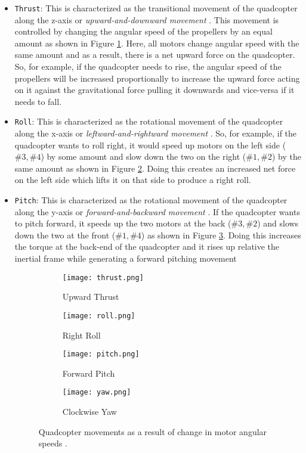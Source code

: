 \documentclass[10pt, a4paper]{article}
\newcommand{\textDef}[1]{\texttt{#1}}
\newcommand{\fig}[1]{Figure \ref{#1}}
\begin{document}
    \begin{itemize}
        \item \textDef{Thrust}: This is characterized as the transitional movement of the quadcopter along the z-axis or \textit{upward-and-downward movement} \cite{book}. This movement is controlled by changing the angular speed of the propellers by an equal amount as shown in \fig{Thrust}. Here, all motors change angular speed with the same amount and as a result, there is a net upward force on the quadcopter. So, for example, if the quadcopter needs to rise, the angular speed of the propellers will be increased proportionally to increase the upward force acting on it against the gravitational force pulling it downwards and vice-versa if it needs to fall.
        \item \textDef{Roll}: This is characterized as the rotational movement of the quadcopter along the x-axis or \textit{leftward-and-rightward movement} \cite{book}. So, for example, if the quadcopter wants to roll right, it would speed up motors on the left side ($\#3, \#4$) by some amount and slow down the two on the right ($\#1, \#2$) by the same amount as shown in \fig{roll}. Doing this creates an increased net force on the left side which lifts it on that side to produce a right roll.

        \item \textDef{Pitch}: This is characterized as the rotational movement of the quadcopter along the y-axis or \textit{forward-and-backward movement} \cite{book}. If the quadcopter wants to pitch forward, it speeds up the two motors at the back ($\#3, \#2$) and slows down the two at the front ($\#1, \#4$) as shown in \fig{pitch}. Doing this increases the torque at the back-end of the quadcopter and it rises up relative the inertial frame while generating a forward pitching movement
                
\begin{figure}[hbt!]
    \centering
    \begin{subfigure}[b]{0.41\textwidth}
        \centering
        \texttt{[image: thrust.png]}
        \caption{Upward Thrust}
        \label{Thrust}
    \end{subfigure}
    \hfill
    \begin{subfigure}[b]{0.45\textwidth}
        \centering
        \texttt{[image: roll.png]}
        \caption{Right Roll}
        \label{roll}        
    \end{subfigure}
    \hfill
    \begin{subfigure}[b]{0.45\textwidth}
        \centering
        \texttt{[image: pitch.png]}
        \caption{Forward Pitch}
        \label{pitch}        
    \end{subfigure}
    \hfill
    \begin{subfigure}[b]{0.41\textwidth}
        \centering
        \texttt{[image: yaw.png]}
        \caption{Clockwise Yaw}
        \label{yaw}        
    \end{subfigure}
    \caption{Quadcopter movements as a result of change in motor angular speeds \cite{book}.}
    \label{Movements}
\end{figure}


\end{itemize}
\end{document}
